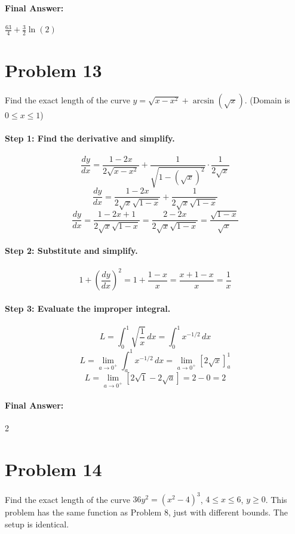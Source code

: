 \documentclass{article}
\begin{document}
\paragraph{Final Answer:} $\frac{63}{4} + \frac{3}{2}\ln(2)$

\section*{Problem 13}
Find the exact length of the curve $y = \sqrt{x - x^2} + \arcsin(\sqrt{x})$. (Domain is $0 \le x \le 1$)

\paragraph{Step 1: Find the derivative and simplify.}
\[ \frac{dy}{dx} = \frac{1 - 2x}{2\sqrt{x - x^2}} + \frac{1}{\sqrt{1 - (\sqrt{x})^2}} \cdot \frac{1}{2\sqrt{x}} \]
\[ \frac{dy}{dx} = \frac{1 - 2x}{2\sqrt{x}\sqrt{1-x}} + \frac{1}{2\sqrt{x}\sqrt{1-x}} \]
\[ \frac{dy}{dx} = \frac{1 - 2x + 1}{2\sqrt{x}\sqrt{1-x}} = \frac{2 - 2x}{2\sqrt{x}\sqrt{1-x}} = \frac{\sqrt{1-x}}{\sqrt{x}} \]

\paragraph{Step 2: Substitute and simplify.}
\[ 1 + (\frac{dy}{dx})^2 = 1 + \frac{1-x}{x} = \frac{x + 1 - x}{x} = \frac{1}{x} \]

\paragraph{Step 3: Evaluate the improper integral.}
\[ L = \int_{0}^{1} \sqrt{\frac{1}{x}} \,dx = \int_{0}^{1} x^{-1/2} \,dx \]
\[ L = \lim_{a\to0^+} \int_{a}^{1} x^{-1/2} \,dx = \lim_{a\to0^+} [2\sqrt{x}]_{a}^{1} \]
\[ L = \lim_{a\to0^+} [2\sqrt{1} - 2\sqrt{a}] = 2 - 0 = 2 \]

\paragraph{Final Answer:} 2

\section*{Problem 14}
Find the exact length of the curve $36y^2 = (x^2 - 4)^3$, $4 \le x \le 6$, $y \ge 0$.
This problem has the same function as Problem 8, just with different bounds. The setup is identical.
\end{document}

